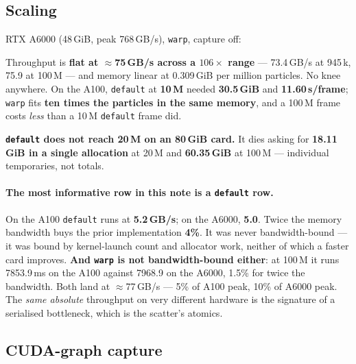 \documentclass[11pt,a4paper]{article}
\newcommand{\code}[1]{\texttt{\small #1}}
\newcommand{\gd}[1]{\textcolor{good}{\textbf{#1}}}
\newcommand{\bd}[1]{\textcolor{bad}{\textbf{#1}}}
\begin{document}
\subsection{Scaling}

RTX A6000 (48\,GiB, peak 768\,GB/s), \code{warp}, capture off:

\begin{center}\footnotesize\tblSweepAsix\end{center}

\noindent
Throughput is \gd{flat at $\approx$75\,GB/s across a $106\times$ range} --- 73.4\,GB/s at 945\,k,
75.9 at 100\,M --- and memory linear at 0.309\,GiB per million particles. No knee anywhere. On the
A100, \code{default} at \textbf{10\,M} needed \textbf{30.5\,GiB} and \textbf{11.60\,s/frame};
\code{warp} fits \gd{ten times the particles in the same memory}, and a 100\,M frame costs
\emph{less} than a 10\,M \code{default} frame did.

\begin{center}\footnotesize\tblAhunPair\end{center}
\begin{center}\footnotesize\tblAhunDefault\end{center}

\noindent
\bd{\code{default} does not reach 20\,M on an 80\,GiB card.} It dies asking for \bd{18.11\,GiB in a
single allocation} at 20\,M and \bd{60.35\,GiB} at 100\,M --- individual temporaries, not totals.

\paragraph{The most informative row in this note is a \code{default} row.} On the A100 \code{default}
runs at \bd{5.2\,GB/s}; on the A6000, \bd{5.0}. Twice the memory bandwidth buys the prior
implementation \bd{4\%}. It was never bandwidth-bound --- it was bound by kernel-launch count and
allocator work, neither of which a faster card improves. \textbf{And \code{warp} is not
bandwidth-bound either}: at 100\,M it runs 7853.9\,ms on the A100 against 7968.9 on the A6000, 1.5\%
for twice the bandwidth. Both land at $\approx$77\,GB/s --- 5\% of A100 peak, 10\% of A6000 peak. The
\emph{same absolute} throughput on very different hardware is the signature of a serialised
bottleneck, which is the scatter's atomics.

\subsection{CUDA-graph capture}
\end{document}
